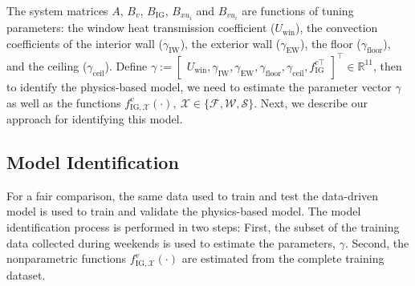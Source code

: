 The system matrices $A$, $B_v$, $B_\text{IG}$, $B_{xu_i}$ and $B_{vu_i}$ are functions of tuning parameters: the window heat transmission coefficient ($U_\text{win}$), the convection coefficients of the interior wall ($\gamma_\text{IW}$), the exterior wall ($\gamma_\text{EW}$), the floor ($\gamma_\text{floor}$), and the ceiling ($\gamma_\text{ceil}$). 
Define $\gamma := \begin{bmatrix} U_\text{win}, \gamma_\text{IW}, \gamma_\text{EW}, \gamma_\text{floor}, \gamma_\text{ceil}, f_\text{IG}^{c\top} \end{bmatrix}^\top \in \mathbb{R}^{11}$, then to identify the physics-based model, we need to estimate the parameter vector $\gamma$ as well as the functions $f_{\text{IG},\mathcal{X}}^v(\cdot),~\mathcal{X} \in \{\mathcal{F}, \mathcal{W}, \mathcal{S}\}$.
Next, we describe our approach for identifying this model.

\subsection{Model Identification}\label{sec:physics_id}

For a fair comparison, the same data used to train and test the data-driven model is used to train and validate the physics-based model. 
The model identification process is performed in two steps: First, the subset of the training data collected during weekends is used to estimate the parameters, $\gamma$. Second, the nonparametric functions $f_{\text{IG},\mathcal{X}}^v(\cdot)$ are estimated from the complete training dataset.

\vspace*{0.2cm}
